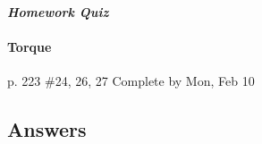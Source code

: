 \documentclass[10pt]{exam}
\begin{document}
\hfill \textbf{\emph{Homework Quiz}}





\paragraph{Torque} p. 223 \#24, 26, 27
\dotfill Complete by Mon, Feb 10








\subsection*{Answers}
\end{document}
